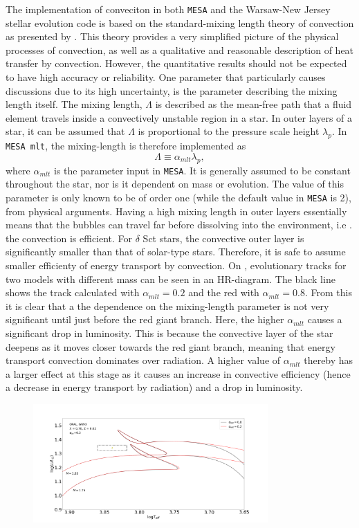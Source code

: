 The implementation of conveciton in both \texttt{MESA} and the Warsaw-New Jersey stellar evolution code is based on the standard-mixing length theory of convection as presented by \citet{weiss2004cox}. This theory provides a very simplified picture of the physical processes of convection, as well as a qualitative and reasonable description of heat transfer by convection. However, the quantitative results should not be expected to have high accuracy or reliability. One parameter that particularly causes discussions due to its high uncertainty, is the parameter describing the mixing length itself. The mixing length, $\Lambda$ is described as the mean-free path that a fluid element travels inside a convectively unstable region in a star. In outer layers of a star, it can be assumed that $\Lambda$ is proportional to the pressure scale height $\lambda_p$. In \texttt{MESA mlt}, the mixing-length is therefore implemented as
%
\begin{equation}
    \Lambda \equiv \alpha_{mlt} \lambda_p,
\end{equation}
%
where $\alpha_{mlt}$ is the parameter input in \texttt{MESA}. It is generally assumed to be constant throughout the star, nor is it dependent on mass or evolution. The value of this parameter is only known to be of order one (while the default value in \texttt{MESA} is 2), from physical arguments. Having a high mixing length in outer layers essentially means that the bubbles can travel far before dissolving into the environment, i.e . the convection is efficient. For $\delta$ Sct stars, the convective outer layer is significantly smaller than that of solar-type stars. Therefore, it is safe to assume smaller efficienty of energy transport by convection. On , evolutionary tracks for two models with different mass can be seen in an HR-diagram. The black line shows the track calculated with  $\alpha_{mlt}= 0.2$ and the red with $\alpha_{mlt}= 0.8$. From this it is clear that a the dependence on the mixing-length parameter is not very significant until just before the red giant branch. Here, the higher $\alpha_{mlt}$ causes a significant drop in luminosity. This is because the convective layer of the star deepens as it moves closer towards the red giant branch, meaning that energy transport convection dominates over radiation. A higher value of $\alpha_{mlt}$ thereby has a larger effect at this stage as it causes an increase in convective efficiency (hence a decrease in energy transport by radiation) and a drop in luminosity. 


\begin{figure}[htbp]
    \centering
    \includegraphics[width=0.8\textwidth]{mlt.png}
    \caption{}
    \label{mlt}
\end{figure}

